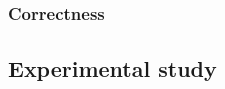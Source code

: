 \subsubsection{Correctness}
\label{sec:correctnessNEO}

\subsection{Experimental study}
\label{sec:experimentsNEO}
